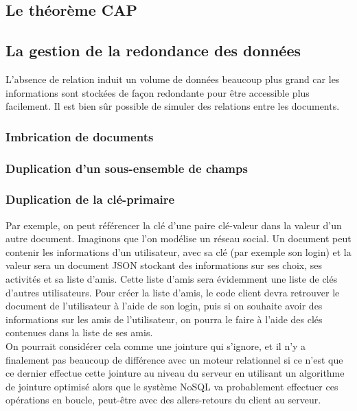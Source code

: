 \subsection{Le théorème CAP}
\subsection{La gestion de la redondance des données}
	L'absence de relation induit un volume de données beaucoup plus grand car les informations sont stockées de façon redondante pour être accessible plus facilement. Il est bien sûr possible de simuler des relations entre les documents.

	\subsubsection{Imbrication de documents}
	\subsubsection{Duplication d'un sous-ensemble de champs}
	\subsubsection{Duplication de la clé-primaire}
		Par exemple, on peut référencer la clé d'une paire clé-valeur dans la valeur d'un autre document. Imaginons que l'on modélise un réseau social. Un document peut contenir les informations d'un utilisateur, avec sa clé (par exemple son login) et la valeur sera un document JSON stockant des informations sur ses choix, ses activités et sa liste d'amis. Cette liste d'amis sera évidemment une liste de clés d'autres utilisateurs. Pour créer la liste d'amis, le code client devra retrouver le document de l'utilisateur à l'aide de son login, puis si on souhaite avoir des informations sur les amis de l'utilisateur, on pourra le faire à l'aide des clés contenues dans la liste de ses amis.\\

		On pourrait considérer cela comme une jointure qui s'ignore, et il n'y a finalement pas beaucoup de différence avec un moteur relationnel si ce n'est que ce dernier effectue cette jointure au niveau du serveur en utilisant un algorithme de jointure optimisé alors que le système NoSQL va probablement effectuer ces opérations en boucle, peut-être avec des allers-retours du client au serveur.